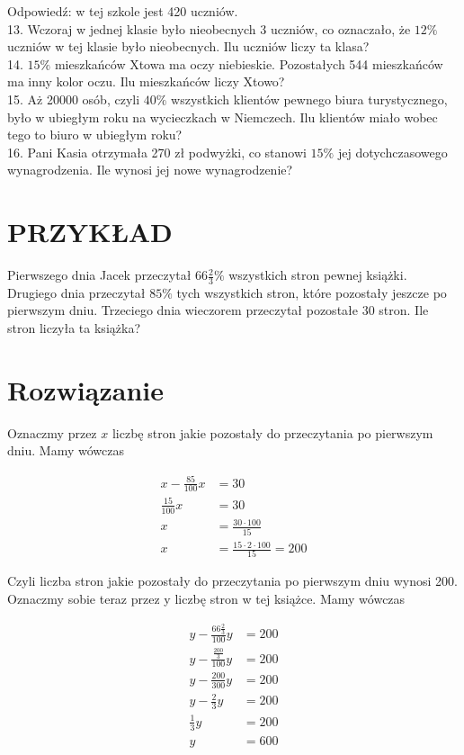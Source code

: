 \documentclass[10pt]{article}
\begin{document}
Odpowiedź: w tej szkole jest 420 uczniów.\\
13. Wczoraj w jednej klasie było nieobecnych 3 uczniów, co oznaczało, że \(12 \%\) uczniów w tej klasie było nieobecnych. Ilu uczniów liczy ta klasa?\\
14. \(15 \%\) mieszkańców Xtowa ma oczy niebieskie. Pozostałych 544 mieszkańców ma inny kolor oczu. Ilu mieszkańców liczy Xtowo?\\
15. Aż 20000 osób, czyli \(40 \%\) wszystkich klientów pewnego biura turystycznego, było w ubiegłym roku na wycieczkach w Niemczech. Ilu klientów miało wobec tego to biuro w ubiegłym roku?\\
16. Pani Kasia otrzymała 270 zł podwyżki, co stanowi \(15 \%\) jej dotychczasowego wynagrodzenia. Ile wynosi jej nowe wynagrodzenie?

\section*{PRZYKŁAD}
Pierwszego dnia Jacek przeczytał \(66 \frac{2}{3} \%\) wszystkich stron pewnej książki. Drugiego dnia przeczytał \(85 \%\) tych wszystkich stron, które pozostały jeszcze po pierwszym dniu. Trzeciego dnia wieczorem przeczytał pozostałe 30 stron. Ile stron liczyła ta książka?

\section*{Rozwiązanie}
Oznaczmy przez \(x\) liczbę stron jakie pozostały do przeczytania po pierwszym dniu. Mamy wówczas

\[
\begin{aligned}
x-\frac{85}{100} x & =30 \\
\frac{15}{100} x & =30 \\
x & =\frac{30 \cdot 100}{15} \\
x & =\frac{15 \cdot 2 \cdot 100}{15}=200
\end{aligned}
\]

Czyli liczba stron jakie pozostały do przeczytania po pierwszym dniu wynosi 200. Oznaczmy sobie teraz przez y liczbę stron w tej książce. Mamy wówczas

\[
\begin{aligned}
y-\frac{66 \frac{2}{3}}{100} y & =200 \\
y-\frac{\frac{200}{3}}{100} y & =200 \\
y-\frac{200}{300} y & =200 \\
y-\frac{2}{3} y & =200 \\
\frac{1}{3} y & =200 \\
y & =600
\end{aligned}
\]
\end{document}
